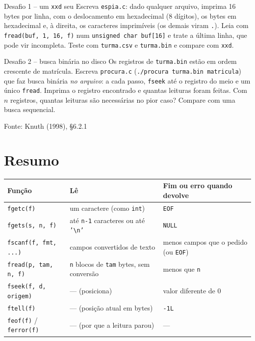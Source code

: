 \documentclass[11pt,a4paper]{article}
\newcommand{\fonte}[1]{\par\smallskip\hfill
  {\footnotesize\textcolor{UFSGray}{Fonte: #1}}\par\medskip}
\begin{document}
\begin{tarefa}{Desafio 1 -- um \texttt{xxd} seu}
Escreva \texttt{espia.c}: dado qualquer arquivo, imprima 16 bytes por linha,
com o deslocamento em hexadecimal (8 dígitos), os bytes em hexadecimal e, à
direita, os caracteres imprimíveis (os demais viram \texttt{.}). Leia com
\texttt{fread(buf, 1, 16, f)} num \texttt{unsigned char buf[16]} e trate a
última linha, que pode vir incompleta. Teste com \texttt{turma.csv} e
\texttt{turma.bin} e compare com \texttt{xxd}.
\end{tarefa}

\begin{tarefa}{Desafio 2 -- busca binária no disco}
Os registros de \texttt{turma.bin} estão em ordem crescente de matrícula.
Escreva \texttt{procura.c} (\texttt{./procura turma.bin matricula}) que faz
busca binária \emph{no arquivo}: a cada passo, \texttt{fseek} até o registro do
meio e um único \texttt{fread}. Imprima o registro encontrado e quantas
leituras foram feitas. Com $n$ registros, quantas leituras são necessárias no
pior caso? Compare com uma busca sequencial.
\fonte{Knuth (1998), §6.2.1~\cite{knuth1998art}}
\end{tarefa}

\section{Resumo}

\begin{center}
\small
\begin{tabular}{@{}lll@{}}
\toprule
\textbf{Função} & \textbf{Lê} & \textbf{Fim ou erro quando devolve} \\
\midrule
\texttt{fgetc(f)} & um caractere (como \texttt{int}) & \texttt{EOF} \\
\texttt{fgets(s, n, f)} & até \texttt{n-1} caracteres ou até \texttt{'\textbackslash n'} & \texttt{NULL} \\
\texttt{fscanf(f, fmt, ...)} & campos convertidos de texto & menos campos que o pedido (ou \texttt{EOF}) \\
\texttt{fread(p, tam, n, f)} & \texttt{n} blocos de \texttt{tam} bytes, sem conversão & menos que \texttt{n} \\
\midrule
\texttt{fseek(f, d, origem)} & --- (posiciona) & valor diferente de 0 \\
\texttt{ftell(f)} & --- (posição atual em bytes) & \texttt{-1L} \\
\texttt{feof(f)} / \texttt{ferror(f)} & --- (por que a leitura parou) & --- \\
\bottomrule
\end{tabular}
\end{center}
\end{document}
